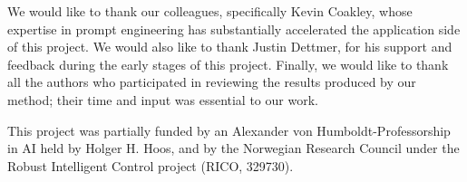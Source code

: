 \documentclass[letterpaper]{article} %
\begin{document}
We would like to thank our colleagues, specifically Kevin Coakley, whose expertise in prompt engineering has substantially accelerated the application side of this project. We would also like to thank Justin Dettmer, for his support and feedback during the early stages of this project. Finally, we would like to thank all the authors who participated in reviewing the results produced by our method; their time and input was essential to our work.

This project was partially funded by an Alexander von Humboldt-Professorship in AI held by Holger H. Hoos, and by the Norwegian Research Council under the Robust Intelligent Control project (RICO, 329730).




\end{document}
